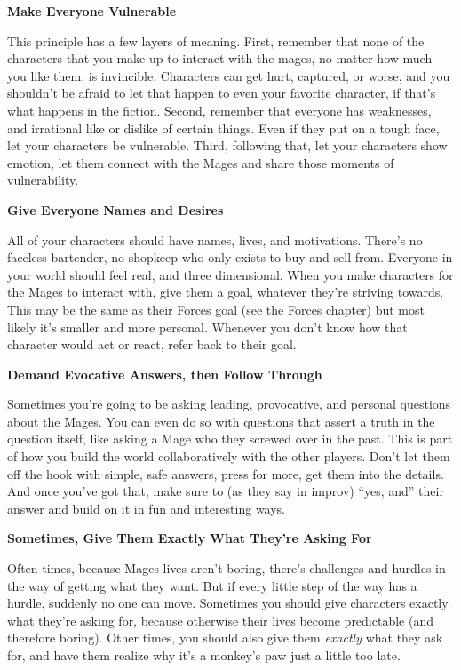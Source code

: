 \documentclass[
  oneside,
  statementpaper,
  9pt]{memoir}
\begin{document}
\textbf{Make Everyone Vulnerable}

This principle has a few layers of meaning. First, remember that none of
the characters that you make up to interact with the mages, no matter
how much you like them, is invincible. Characters can get hurt,
captured, or worse, and you shouldn't be afraid to let that happen to
even your favorite character, if that's what happens in the fiction.
Second, remember that everyone has weaknesses, and irrational like or
dislike of certain things. Even if they put on a tough face, let your
characters be vulnerable. Third, following that, let your characters
show emotion, let them connect with the Mages and share those moments of
vulnerability.

\textbf{Give Everyone Names and Desires}

All of your characters should have names, lives, and motivations.
There's no faceless bartender, no shopkeep who only exists to buy and
sell from. Everyone in your world should feel real, and three
dimensional. When you make characters for the Mages to interact with,
give them a goal, whatever they're striving towards. This may be the
same as their Forces goal (see the Forces chapter) but most likely it's
smaller and more personal. Whenever you don't know how that character
would act or react, refer back to their goal.

\textbf{Demand Evocative Answers, then Follow Through}

Sometimes you're going to be asking leading, provocative, and personal
questions about the Mages. You can even do so with questions that assert
a truth in the question itself, like asking a Mage who they screwed over
in the past. This is part of how you build the world collaboratively
with the other players. Don't let them off the hook with simple, safe
answers, press for more, get them into the details. And once you've got
that, make sure to (as they say in improv) ``yes, and'' their answer and
build on it in fun and interesting ways.

\textbf{Sometimes, Give Them Exactly What They're Asking For}

Often times, because Mages lives aren't boring, there's challenges and
hurdles in the way of getting what they want. But if every little step
of the way has a hurdle, suddenly no one can move. Sometimes you should
give characters exactly what they're asking for, because otherwise their
lives become predictable (and therefore boring). Other times, you should
also give them \emph{exactly} what they ask for, and have them realize
why it's a monkey's paw just a little too late.
\end{document}
